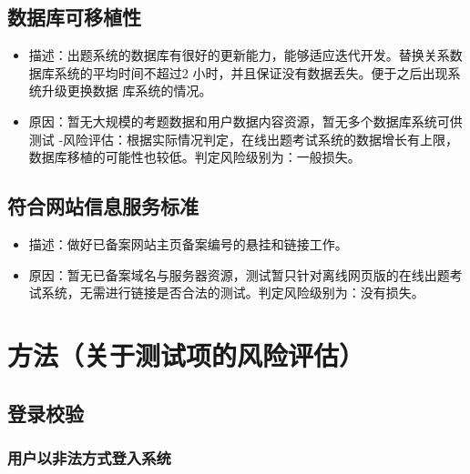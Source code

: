 \documentclass[hyperref, a4paper]{ctexart}
\providecommand{\tightlist}{%
  \setlength{\itemsep}{0pt}\setlength{\parskip}{0pt}}
\begin{document}
\hypertarget{ux6570ux636eux5e93ux53efux79fbux690dux6027-1}{%
\subsection{数据库可移植性}\label{ux6570ux636eux5e93ux53efux79fbux690dux6027-1}}

\begin{itemize}
\tightlist
\item
  描述：出题系统的数据库有很好的更新能力，能够适应迭代开发。替换关系数据库系统的平均时间不超过2
  小时，并且保证没有数据丢失。便于之后出现系统升级更换数据
  库系统的情况。
\item
  原因：暂无大规模的考题数据和用户数据内容资源，暂无多个数据库系统可供测试
  -风险评估：根据实际情况判定，在线出题考试系统的数据增长有上限，数据库移植的可能性也较低。判定风险级别为：一般损失。
\end{itemize}

\hypertarget{ux7b26ux5408ux7f51ux7ad9ux4fe1ux606fux670dux52a1ux6807ux51c6-1}{%
\subsection{符合网站信息服务标准}\label{ux7b26ux5408ux7f51ux7ad9ux4fe1ux606fux670dux52a1ux6807ux51c6-1}}

\begin{itemize}
\tightlist
\item
  描述：做好已备案网站主页备案编号的悬挂和链接工作。
\item
  原因：暂无已备案域名与服务器资源，测试暂只针对离线网页版的在线出题考试系统，无需进行链接是否合法的测试。判定风险级别为：没有损失。
\end{itemize}

\hypertarget{ux65b9ux6cd5ux5173ux4e8eux6d4bux8bd5ux9879ux7684ux98ceux9669ux8bc4ux4f30}{%
\section{方法（关于测试项的风险评估）}\label{ux65b9ux6cd5ux5173ux4e8eux6d4bux8bd5ux9879ux7684ux98ceux9669ux8bc4ux4f30}}

\hypertarget{ux767bux5f55ux6821ux9a8c}{%
\subsection{登录校验}\label{ux767bux5f55ux6821ux9a8c}}

\hypertarget{ux7528ux6237ux4ee5ux975eux6cd5ux65b9ux5f0fux767bux5165ux7cfbux7edf}{%
\subsubsection{用户以非法方式登入系统}\label{ux7528ux6237ux4ee5ux975eux6cd5ux65b9ux5f0fux767bux5165ux7cfbux7edf}}
\end{document}
